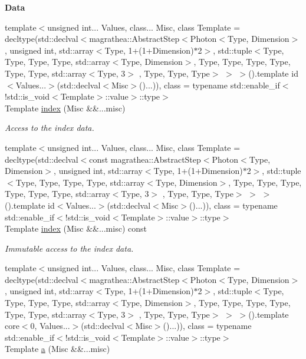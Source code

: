 \begin{Indent}{\bf Data}\par
\begin{DoxyCompactItemize}
\item 
{\footnotesize template$<$unsigned int... Values, class... Misc, class Template  = decltype(std\-::declval$<$magrathea\-::\-Abstract\-Step$<$\-Photon$<$\-Type, Dimension$>$, unsigned int, std\-::array$<$\-Type, 1+(1+\-Dimension)$\ast$2$>$, std\-::tuple$<$\-Type, Type, Type, Type, std\-::array$<$\-Type, Dimension$>$, Type, Type, Type, Type, Type, Type, std\-::array$<$\-Type, 3$>$ , Type, Type, Type$>$ $>$ $>$().\-template id$<$\-Values...$>$(std\-::declval$<$\-Misc$>$()...)), class  = typename std\-::enable\-\_\-if$<$!std\-::is\-\_\-void$<$\-Template$>$\-::value$>$\-::type$>$ }\\Template \hyperlink{exceptionPhoton_ab80ac84513c9082f2bb8bc0d776f12b0}{index} (Misc \&\&...misc)
\begin{DoxyCompactList}\small\item\em Access to the index data. \end{DoxyCompactList}\item 
{\footnotesize template$<$unsigned int... Values, class... Misc, class Template  = decltype(std\-::declval$<$const magrathea\-::\-Abstract\-Step$<$\-Photon$<$\-Type, Dimension$>$, unsigned int, std\-::array$<$\-Type, 1+(1+\-Dimension)$\ast$2$>$, std\-::tuple$<$\-Type, Type, Type, Type, std\-::array$<$\-Type, Dimension$>$, Type, Type, Type, Type, Type, Type, std\-::array$<$\-Type, 3$>$ , Type, Type, Type$>$ $>$ $>$().\-template id$<$\-Values...$>$(std\-::declval$<$\-Misc$>$()...)), class  = typename std\-::enable\-\_\-if$<$!std\-::is\-\_\-void$<$\-Template$>$\-::value$>$\-::type$>$ }\\Template \hyperlink{exceptionPhoton_a655852ccbf34be40427d6f708a032198}{index} (Misc \&\&...misc) const 
\begin{DoxyCompactList}\small\item\em Immutable access to the index data. \end{DoxyCompactList}\item 
{\footnotesize template$<$unsigned int... Values, class... Misc, class Template  = decltype(std\-::declval$<$magrathea\-::\-Abstract\-Step$<$\-Photon$<$\-Type, Dimension$>$, unsigned int, std\-::array$<$\-Type, 1+(1+\-Dimension)$\ast$2$>$, std\-::tuple$<$\-Type, Type, Type, Type, std\-::array$<$\-Type, Dimension$>$, Type, Type, Type, Type, Type, Type, std\-::array$<$\-Type, 3$>$ , Type, Type, Type$>$ $>$ $>$().\-template core$<$0, Values...$>$(std\-::declval$<$\-Misc$>$()...)), class  = typename std\-::enable\-\_\-if$<$!std\-::is\-\_\-void$<$\-Template$>$\-::value$>$\-::type$>$ }\\Template \hyperlink{exceptionPhoton_ab990012b6e6d8c4d85377dcd555f7fff}{a} (Misc \&\&...misc)

\end{DoxyCompactItemize}
\end{Indent}

